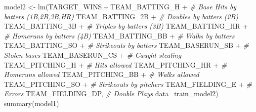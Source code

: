 \documentclass[
]{article}
\newenvironment{Shaded}{\begin{snugshade}}{\end{snugshade}}
\newcommand{\AttributeTok}[1]{\textcolor[rgb]{0.77,0.63,0.00}{#1}}
\newcommand{\CommentTok}[1]{\textcolor[rgb]{0.56,0.35,0.01}{\textit{#1}}}
\newcommand{\FunctionTok}[1]{\textcolor[rgb]{0.00,0.00,0.00}{#1}}
\newcommand{\NormalTok}[1]{#1}
\newcommand{\OtherTok}[1]{\textcolor[rgb]{0.56,0.35,0.01}{#1}}
\newcommand{\SpecialCharTok}[1]{\textcolor[rgb]{0.00,0.00,0.00}{#1}}
\begin{document}
\begin{Shaded}
\begin{Highlighting}[]
\NormalTok{model2 }\OtherTok{\textless{}{-}} \FunctionTok{lm}\NormalTok{(TARGET\_WINS }\SpecialCharTok{\textasciitilde{}} 
\NormalTok{               TEAM\_BATTING\_H }\SpecialCharTok{+}   \CommentTok{\# Base Hits by batters (1B,2B,3B,HR)}
\NormalTok{               TEAM\_BATTING\_2B }\SpecialCharTok{+}  \CommentTok{\# Doubles by batters (2B) }
\NormalTok{               TEAM\_BATTING\_3B }\SpecialCharTok{+}  \CommentTok{\# Triples by batters (3B)}
\NormalTok{               TEAM\_BATTING\_HR }\SpecialCharTok{+}  \CommentTok{\# Homeruns by batters (4B) }
\NormalTok{               TEAM\_BATTING\_BB }\SpecialCharTok{+}  \CommentTok{\# Walks by batters}
\NormalTok{               TEAM\_BATTING\_SO }\SpecialCharTok{+}  \CommentTok{\# Strikeouts by batters }
\NormalTok{               TEAM\_BASERUN\_SB }\SpecialCharTok{+}  \CommentTok{\# Stolen bases}
\NormalTok{               TEAM\_BASERUN\_CS }\SpecialCharTok{+}  \CommentTok{\# Caught stealing }
\NormalTok{               TEAM\_PITCHING\_H }\SpecialCharTok{+}  \CommentTok{\# Hits allowed}
\NormalTok{               TEAM\_PITCHING\_HR }\SpecialCharTok{+} \CommentTok{\# Homeruns allowed}
\NormalTok{               TEAM\_PITCHING\_BB }\SpecialCharTok{+} \CommentTok{\# Walks allowed}
\NormalTok{               TEAM\_PITCHING\_SO }\SpecialCharTok{+} \CommentTok{\# Strikeouts by pitchers}
\NormalTok{               TEAM\_FIELDING\_E }\SpecialCharTok{+}  \CommentTok{\# Errors}
\NormalTok{               TEAM\_FIELDING\_DP,  }\CommentTok{\# Double Plays}
             \AttributeTok{data=}\NormalTok{train\_model2)}
\FunctionTok{summary}\NormalTok{(model1)}
\end{Highlighting}
\end{Shaded}
\end{document}
